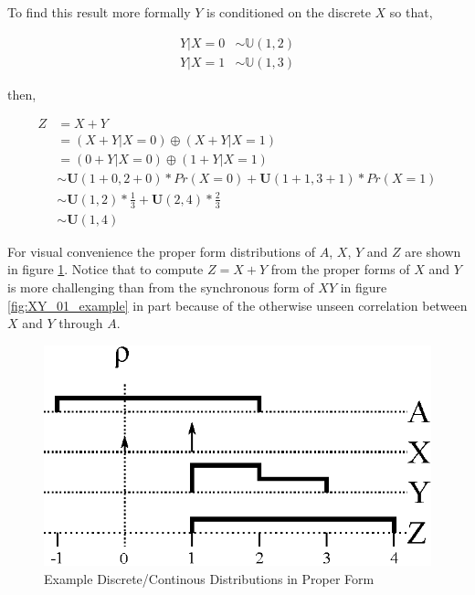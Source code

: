 To find this result more formally $Y$ is conditioned on the discrete $X$ so that,

\begin{align*}
Y | X = 0 &\sim \mathbb{U}(1,2)\\
Y | X = 1 &\sim \mathbb{U}(1,3)
\end{align*}

then,

\begin{align*}
Z &= X + Y\\
  &= (X + Y | X = 0) \oplus (X + Y | X = 1)\\
  &= (0 + Y | X = 0) \oplus (1 + Y | X = 1)\\
  &\sim \mathbf{U}(1+0,2+0) * Pr(X = 0) + \mathbf{U}(1+1,3+1) * Pr(X = 1)\\
  &\sim \mathbf{U}(1,2) * \frac{1}{3} + \mathbf{U}(2,4) * \frac{2}{3}\\
  &\sim \mathbf{U}(1,4)
\end{align*}

For visual convenience the proper form distributions of $A$, $X$, $Y$ and $Z$ are shown in figure \ref{fig:XY_example_distributions}. Notice that to compute $Z = X + Y$ from the proper forms of $X$ and $Y$ is more challenging than from the synchronous form of $XY$ in figure \ref{fig:XY_01_example} in part because of the otherwise unseen correlation between $X$ and $Y$ through $A$.

\begin{figure}
  \centering
  \includegraphics{Images/XY_example_distributions.eps}
  \caption[Example Discrete/Continuous Distributions in Proper Form]
          {Example Discrete/Continous Distributions in Proper Form}
  \label{fig:XY_example_distributions}
\end{figure}
